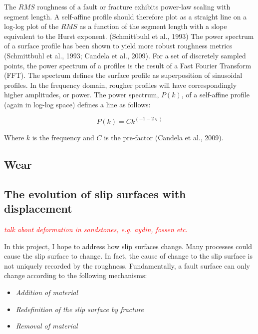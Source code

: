 \documentclass[12pt,a4paper]{article}
\begin{document}
	The $RMS$ roughness of a fault or fracture exhibits power-law scaling with segment length. A self-affine profile should therefore plot as a straight line on a log-log plot of the $RMS$ as a function of the segment length with a slope equivalent to the Hurst exponent. (Schmittbuhl et al., 1993)
The power spectrum of a surface profile has been shown to yield more robust roughness metrics (Schmittbuhl et al., 1993; Candela et al., 2009). For a set of discretely sampled points, the power spectrum of a profiles is the result of a Fast Fourier Transform (FFT). The spectrum defines the surface profile as superposition of sinusoidal profiles.   In the frequency domain, rougher profiles will have correspondingly higher amplitudes, or power. The power spectrum, $P(k)$, of a self-affine profile (again in log-log space) defines a line as follows:

\begin{equation}
P(k) = Ck^{(-1-2\varsigma)}
\end{equation}

Where $k$ is the frequency and $C$ is the pre-factor (Candela et al., 2009). 


\subsection{Wear}

\subsection{The evolution of slip surfaces with displacement}

\textcolor{red}{\textit{talk about deformation in sandstones, e.g. aydin, fossen etc.}}

In this project, I hope to address how slip surfaces change. Many processes could cause the slip surface to change.   In fact, the cause of change to the slip surface is not uniquely recorded by the roughness. Fundamentally, a fault surface can only change according to the following mechanisms:
\begin{itemize}
	\item[] \textit{Addition of material}
	\item[] \textit{Redefinition of the slip surface by fracture}
	\item[] \textit{Removal of material}
\end{itemize}
	
\end{document}
